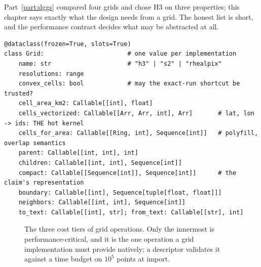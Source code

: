 \documentclass[10pt,a4paper]{article}
\begin{document}
Part~\ref{part:dggs} compared four grids and chose H3 on three properties; this chapter says exactly what the design needs from a grid. The
honest list is short, and the performance contract decides what may be abstracted at all.

\begin{lstlisting}
@dataclass(frozen=True, slots=True)
class Grid:                       # one value per implementation
    name: str                     # "h3" | "s2" | "rhealpix"
    resolutions: range
    convex_cells: bool            # may the exact-run shortcut be trusted?
    cell_area_km2: Callable[[int], float]
    cells_vectorized: Callable[[Arr, Arr, int], Arr]       # lat, lon -> ids: THE hot kernel
    cells_for_area: Callable[[Ring, int], Sequence[int]]   # polyfill, overlap semantics
    parent: Callable[[int, int], int]
    children: Callable[[int, int], Sequence[int]]
    compact: Callable[[Sequence[int]], Sequence[int]]      # the claim's representation
    boundary: Callable[[int], Sequence[tuple[float, float]]]
    neighbors: Callable[[int, int], Sequence[int]]
    to_text: Callable[[int], str]; from_text: Callable[[str], int]
\end{lstlisting}

\begin{figure}[tbp]
\centering
{}
\caption{The three cost tiers of grid operations. Only the innermost is performance-critical, and it is the one
operation a grid implementation must provide natively; a descriptor validates it against a time budget on
$10^5$ points at import.}
\label{fig:tiers}
\end{figure}
\end{document}
